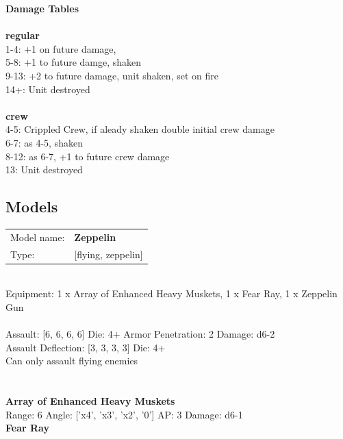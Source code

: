 {\bf Damage Tables} \\
\ \\ {\bf regular } \\
1-4: +1 on future damage, \\
5-8: +1 to future damge, shaken \\
9-13: +2 to future damage, unit shaken, set on fire \\
14+: Unit destroyed \\
\ \\ {\bf crew } \\
4-5: Crippled Crew, if aleady shaken double initial crew damage \\
6-7: as 4-5, shaken \\
8-12: as 6-7, +1 to future crew damage \\
13: Unit destroyed \\


\clearpage

\subsection{ Models }

\begin{tabular}{ll}
Model name: & {\bf Zeppelin } \\
Type: & [flying, zeppelin] \\
\end{tabular}
\ \\
Equipment: 1 x Array of Enhanced Heavy Muskets, 1 x Fear Ray, 1 x Zeppelin Gun \\
\ \\
Assault: [6, 6, 6, 6] Die: 4+ Armor Penetration: 2 Damage: d6-2 \\
Assault Deflection: [3, 3, 3, 3] Die: 4+\\
\indent Can only assault flying enemies\\ 
 
\ \\

\ \\
{\bf Array of Enhanced Heavy Muskets } \\



Range: 6  Angle: ['x4', 'x3', 'x2', '0'] AP: 3 Damage: d6-1 \\




{\bf Fear Ray } \\



